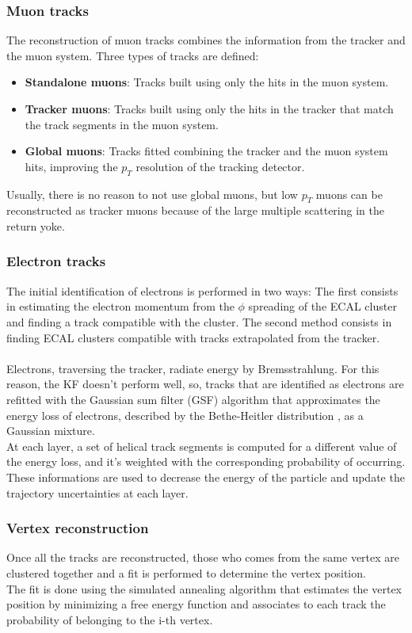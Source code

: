 \subsubsection*{Muon tracks}
The reconstruction of muon tracks combines the information from the tracker and the muon system. Three types of tracks are defined:
\begin{itemize}
    \item \textbf{Standalone muons}: Tracks built using only the hits in the muon system.
    \item \textbf{Tracker muons}: Tracks built using only the hits in the tracker that match the track segments in the muon system.
    \item \textbf{Global muons}: Tracks fitted combining the tracker and the muon system hits, improving the $p_T$ resolution of the tracking detector.
\end{itemize}
Usually, there is no reason to not use global muons, but low $p_T$ muons can be reconstructed as tracker muons because of the large multiple scattering in the return yoke. 

\subsubsection*{Electron tracks}
The initial identification of electrons is performed in two ways:
The first consists in estimating the electron momentum from the $\phi$ spreading of the ECAL cluster and finding a track compatible with the cluster.
The second method consists in finding ECAL clusters compatible with tracks extrapolated  from the tracker.\\
\\
Electrons, traversing the tracker, radiate energy by Bremsstrahlung. For this reason, the KF doesn't perform well, so, tracks that are identified as electrons are refitted with the Gaussian sum filter (GSF) algorithm \cite{Adam2003ReconstructionLHC} that approximates the energy loss of electrons, described by the Bethe-Heitler distribution \cite{Bethe1934OnElectrons}, as a Gaussian mixture.\\
At each layer, a set of helical track segments is computed for a different value of the energy loss, and it's weighted with the corresponding probability of occurring. These informations are used to decrease the energy of the particle and update the trajectory uncertainties at each layer.
\subsubsection*{Vertex reconstruction}
Once all the tracks are reconstructed, those who comes from the same vertex are clustered together and a fit is performed to determine the vertex position.\\
The fit is done using the simulated annealing algorithm \cite{Kirkpatrick1983OptimizationAnnealing} that estimates the vertex position by minimizing a free energy function and associates to each track the probability of belonging to the i-th vertex. \\

